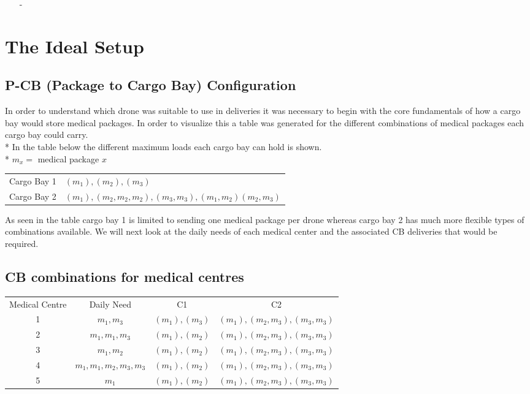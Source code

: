 \documentclass[a4paper,12pt]{article}
\begin{document}
\begin{itemize}
\item[-]
\end{itemize}

\newpage

\section{The Ideal Setup}

\subsection{P-CB (Package to Cargo Bay) Configuration}

In order to understand which drone was suitable to use in deliveries it was necessary to begin with the core fundamentals
of how a cargo bay would store medical packages. In order to visualize this a table was generated for the
different combinations of medical packages each cargo bay could carry.\\*
In the table below the different maximum loads each cargo bay can hold is shown.\\*
$m_x =$ medical package $x$


\begin{center}
\begin{tabular}{ |c|l| }
 \hline
 Cargo Bay 1 & ${(m_1),(m_2),(m_3)}$  \\
 Cargo Bay 2 & ${(m_1),(m_2,m_2,m_2),(m_3,m_3),(m_1,m_2)(m_2,m_3)}$  \\
 \hline
\end{tabular}
\end{center}

As seen in the table cargo bay 1 is limited to sending one medical package per drone whereas cargo bay 2 has much
more flexible types of combinations available.
We will next look at the daily needs of each medical center and the associated CB deliveries that would be required.

\subsection{CB combinations for medical centres}
\begin{center}
\begin{tabular}{ |c|c|c|c| }
 \hline
 Medical Centre & Daily Need & C1 & C2 \\
  1 & $m_1,m_3$ & $(m_1),(m_3)$ & $(m_1),(m_2,m_3),(m_3,m_3)$  \\
  2 & $m_1,m_1,m_3$ & $(m_1),(m_2)$ & $(m_1),(m_2,m_3),(m_3,m_3)$  \\
  3 & $m_1,m_2$ & $(m_1),(m_2)$ & $(m_1),(m_2,m_3),(m_3,m_3)$  \\
  4 & $m_1,m_1,m_2,m_3,m_3$ & $(m_1),(m_2)$ & $(m_1),(m_2,m_3),(m_3,m_3)$  \\
  5 & $m_1$ & $(m_1),(m_2)$ & $(m_1),(m_2,m_3),(m_3,m_3)$  \\
 \hline
\end{tabular}
\end{center}
\end{document}

